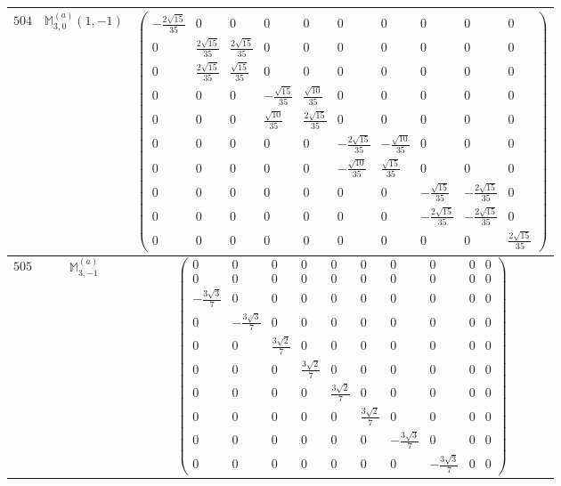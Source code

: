 \documentclass[fleqn,8pt,landscape]{jsarticle}
\begin{document}
\begin{center}
\begin{longtable}{ccc}
$ 504 $ & $ \mathbb{M}_{3,0}^{(a)}(1,-1) $ & $ \begin{pmatrix} - \frac{2 \sqrt{15}}{35} & 0 & 0 & 0 & 0 & 0 & 0 & 0 & 0 & 0 \\ 0 & \frac{2 \sqrt{15}}{35} & \frac{2 \sqrt{15}}{35} & 0 & 0 & 0 & 0 & 0 & 0 & 0 \\ 0 & \frac{2 \sqrt{15}}{35} & \frac{\sqrt{15}}{35} & 0 & 0 & 0 & 0 & 0 & 0 & 0 \\ 0 & 0 & 0 & - \frac{\sqrt{15}}{35} & \frac{\sqrt{10}}{35} & 0 & 0 & 0 & 0 & 0 \\ 0 & 0 & 0 & \frac{\sqrt{10}}{35} & \frac{2 \sqrt{15}}{35} & 0 & 0 & 0 & 0 & 0 \\ 0 & 0 & 0 & 0 & 0 & - \frac{2 \sqrt{15}}{35} & - \frac{\sqrt{10}}{35} & 0 & 0 & 0 \\ 0 & 0 & 0 & 0 & 0 & - \frac{\sqrt{10}}{35} & \frac{\sqrt{15}}{35} & 0 & 0 & 0 \\ 0 & 0 & 0 & 0 & 0 & 0 & 0 & - \frac{\sqrt{15}}{35} & - \frac{2 \sqrt{15}}{35} & 0 \\ 0 & 0 & 0 & 0 & 0 & 0 & 0 & - \frac{2 \sqrt{15}}{35} & - \frac{2 \sqrt{15}}{35} & 0 \\ 0 & 0 & 0 & 0 & 0 & 0 & 0 & 0 & 0 & \frac{2 \sqrt{15}}{35} \end{pmatrix} $ \\ \hline
$ 505 $ & $ \mathbb{M}_{3,-1}^{(a)} $ & $ \begin{pmatrix} 0 & 0 & 0 & 0 & 0 & 0 & 0 & 0 & 0 & 0 \\ 0 & 0 & 0 & 0 & 0 & 0 & 0 & 0 & 0 & 0 \\ - \frac{3 \sqrt{3}}{7} & 0 & 0 & 0 & 0 & 0 & 0 & 0 & 0 & 0 \\ 0 & - \frac{3 \sqrt{3}}{7} & 0 & 0 & 0 & 0 & 0 & 0 & 0 & 0 \\ 0 & 0 & \frac{3 \sqrt{2}}{7} & 0 & 0 & 0 & 0 & 0 & 0 & 0 \\ 0 & 0 & 0 & \frac{3 \sqrt{2}}{7} & 0 & 0 & 0 & 0 & 0 & 0 \\ 0 & 0 & 0 & 0 & \frac{3 \sqrt{2}}{7} & 0 & 0 & 0 & 0 & 0 \\ 0 & 0 & 0 & 0 & 0 & \frac{3 \sqrt{2}}{7} & 0 & 0 & 0 & 0 \\ 0 & 0 & 0 & 0 & 0 & 0 & - \frac{3 \sqrt{3}}{7} & 0 & 0 & 0 \\ 0 & 0 & 0 & 0 & 0 & 0 & 0 & - \frac{3 \sqrt{3}}{7} & 0 & 0 \end{pmatrix} $ \\ \hline

\end{longtable}
\end{center}
\end{document}
